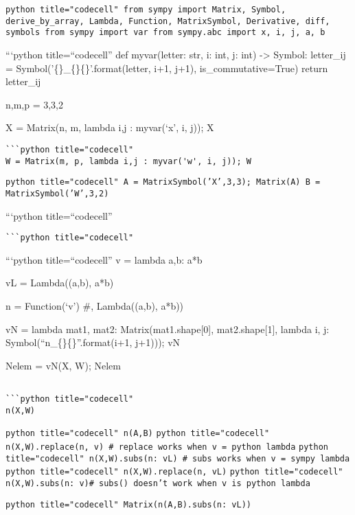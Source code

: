 \documentclass[
]{article}
\author{}
\date{}
\begin{document}
\texttt{python title="codecell" from sympy import Matrix, Symbol, derive_by_array, Lambda, Function, MatrixSymbol, Derivative, diff, symbols from sympy import var from sympy.abc import x, i, j, a, b}

```python title=``codecell'' def myvar(letter: str, i: int, j: int)
-\textgreater{} Symbol: letter\_ij =
Symbol('\{\}\_\{\}\{\}'.format(letter, i+1, j+1), is\_commutative=True)
return letter\_ij

n,m,p = 3,3,2

X = Matrix(n, m, lambda i,j : myvar(`x', i, j)); X

\begin{verbatim}
```python title="codecell"
W = Matrix(m, p, lambda i,j : myvar('w', i, j)); W
\end{verbatim}

\texttt{python title="codecell" A = MatrixSymbol('X',3,3); Matrix(A) B = MatrixSymbol('W',3,2)}

```python title=``codecell''

\begin{verbatim}
```python title="codecell"

\end{verbatim}

```python title=``codecell'' v = lambda a,b: a*b

vL = Lambda((a,b), a*b)

n = Function(`v') \#, Lambda((a,b), a*b))

vN = lambda mat1, mat2: Matrix(mat1.shape{[}0{]}, mat2.shape{[}1{]},
lambda i, j: Symbol(``n\_\{\}\{\}''.format(i+1, j+1))); vN

Nelem = vN(X, W); Nelem

\begin{verbatim}

```python title="codecell"
n(X,W)
\end{verbatim}

\texttt{python title="codecell" n(A,B)}
\texttt{python title="codecell" n(X,W).replace(n, v) # replace works when v = python lambda}
\texttt{python title="codecell" n(X,W).subs({n: vL}) # subs works when v = sympy lambda}
\texttt{python title="codecell" n(X,W).replace(n, vL)}
\texttt{python title="codecell" n(X,W).subs({n: v})# subs() doesn't work when v is python lambda}

\texttt{python title="codecell" Matrix(n(A,B).subs({n: vL}))}
\end{document}
